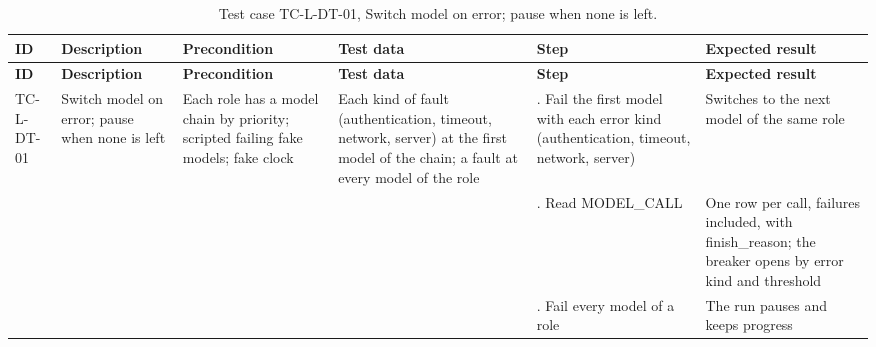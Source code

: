 {\footnotesize{}\renewcommand{\arraystretch}{1.1}
\begin{longtable}{|>{\raggedright\arraybackslash}p{}|>{\raggedright\arraybackslash}p{}|>{\raggedright\arraybackslash}p{}|>{\raggedright\arraybackslash}p{}|>{\raggedright\arraybackslash}p{}|>{\raggedright\arraybackslash}p{}|}
\caption{Test case TC-L-DT-01, Switch model on error; pause when none is left.} \\
\hline
\textbf{ID} & \textbf{Description} & \textbf{Precondition} & \textbf{Test data} & \textbf{Step} & \textbf{Expected result} \\ \hline
\endfirsthead
\hline
\textbf{ID} & \textbf{Description} & \textbf{Precondition} & \textbf{Test data} & \textbf{Step} & \textbf{Expected result} \\ \hline
\endhead
TC-L-DT-01 & Switch model on error; pause when none is left & Each role has a model chain by priority; scripted failing fake models; fake clock & Each kind of fault (authentication, timeout, network, server) at the first model of the chain; a fault at every model of the role & 1. Fail the first model with each error kind (authentication, timeout, network, server) & Switches to the next model of the same role \\ \cline{5-6}
 &  &  &  & 2. Read MODEL\_CALL & One row per call, failures included, with finish\_\allowbreak{}reason; the breaker opens by error kind and threshold \\ \cline{5-6}
 &  &  &  & 3. Fail every model of a role & The run pauses and keeps progress \\ \hline
\end{longtable}
}

